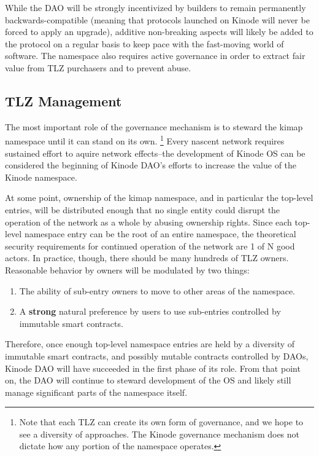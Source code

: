 \documentclass[runningheads]{llncs}
\begin{document}
While the DAO will be strongly incentivized by builders to remain permanently backwards-compatible (meaning that protocols launched on Kinode will never be forced to apply an upgrade), additive non-breaking aspects will likely be added to the protocol on a regular basis to keep pace with the fast-moving world of software. The namespace also requires active governance in order to extract fair value from TLZ purchasers and to prevent abuse.

\subsection{TLZ Management}
\label{sec:daotlzmanagement}

The most important role of the governance mechanism is to steward the kimap namespace until it can stand on its own.
\footnote{Note that each TLZ can create its own form of governance, and we hope to see a diversity of approaches. The Kinode governance mechanism does not dictate how any portion of the namespace operates.}
Every nascent network requires sustained effort to aquire network effects–the development of Kinode OS can be considered the beginning of Kinode DAO's efforts to increase the value of the Kinode namespace.

At some point, ownership of the kimap namespace, and in particular the top-level entries, will be distributed enough that no single entity could disrupt the operation of the network as a whole by abusing ownership rights.
Since each top-level namespace entry can be the root of an entire namespace, the theoretical security requirements for continued operation of the network are 1 of N good actors.
In practice, though, there should be many hundreds of TLZ owners.
Reasonable behavior by owners will be modulated by two things:
\begin{enumerate}
    \item The ability of sub-entry owners to move to other areas of the namespace.
    \item A \textbf{strong} natural preference by users to use sub-entries controlled by immutable smart contracts.
\end{enumerate}

Therefore, once enough top-level namespace entries are held by a diversity of immutable smart contracts, and possibly mutable contracts controlled by DAOs, Kinode DAO will have succeeded in the first phase of its role.
From that point on, the DAO will continue to steward development of the OS and likely still manage significant parts of the namespace itself.
\end{document}
